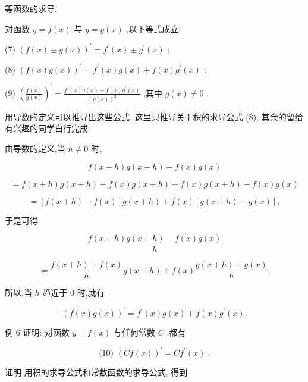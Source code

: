 \documentclass[10pt]{article}
\begin{document}
等函数的求导.

对函数 \(y = f\left( x\right)\) 与 \(y = g\left( x\right)\) ,以下等式成立:

(7) \({\left( f\left( x\right)  \pm  g\left( x\right) \right) }^{\prime } = {f}^{\prime }\left( x\right)  \pm  {g}^{\prime }\left( x\right)\) ;

(8) \({\left( f\left( x\right) g\left( x\right) \right) }^{\prime } = {f}^{\prime }\left( x\right) g\left( x\right)  + f\left( x\right) {g}^{\prime }\left( x\right)\) ;

(9) \({\left( \frac{f\left( x\right) }{g\left( x\right) }\right) }^{\prime } = \frac{{f}^{\prime }\left( x\right) g\left( x\right)  - f\left( x\right) {g}^{\prime }\left( x\right) }{{\left( g\left( x\right) \right) }^{2}}\) ,其中 \(g\left( x\right)  \neq  0\) .

用导数的定义可以推导出这些公式. 这里只推导关于积的求导公式 (8), 其余的留给有兴趣的同学自行完成.

由导数的定义,当 \(h \neq  0\) 时,

\[
f\left( {x + h}\right) g\left( {x + h}\right)  - f\left( x\right) g\left( x\right)
\]

\[
= f\left( {x + h}\right) g\left( {x + h}\right)  - f\left( x\right) g\left( {x + h}\right)  + f\left( x\right) g\left( {x + h}\right)  - f\left( x\right) g\left( x\right)
\]

\[
= \left\lbrack  {f\left( {x + h}\right)  - f\left( x\right) }\right\rbrack  g\left( {x + h}\right)  + f\left( x\right) \left\lbrack  {g\left( {x + h}\right)  - g\left( x\right) }\right\rbrack  ,
\]

于是可得

\[
\frac{f\left( {x + h}\right) g\left( {x + h}\right)  - f\left( x\right) g\left( x\right) }{h}
\]

\[
= \frac{f\left( {x + h}\right)  - f\left( x\right) }{h}g\left( {x + h}\right)  + f\left( x\right) \frac{g\left( {x + h}\right)  - g\left( x\right) }{h}.
\]

所以,当 \(h\) 趋近于 0 时,就有

\[
{\left( f\left( x\right) g\left( x\right) \right) }^{\prime } = {f}^{\prime }\left( x\right) g\left( x\right)  + f\left( x\right) {g}^{\prime }\left( x\right) .
\]

例 6 证明: 对函数 \(y = f\left( x\right)\) 与任何常数 \(C\) ,都有

\[
\text{ (10) }{\left( Cf\left( x\right) \right) }^{\prime } = C{f}^{\prime }\left( x\right) \text{ . }
\]

证明 用积的求导公式和常数函数的求导公式, 得到
\end{document}
